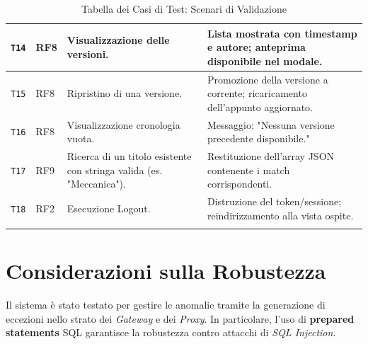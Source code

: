 \begin{longtable}[c]{|p{}|p{}|p{}|p{}|}
    \texttt{T14} & RF8  & Visualizzazione delle versioni. & Lista mostrata con timestamp e autore; anteprima disponibile nel modale. \\ \hline
    \texttt{T15} & RF8  & Ripristino di una versione. & Promozione della versione a corrente; ricaricamento dell'appunto aggiornato. \\ \hline
    \texttt{T16} & RF8  & Visualizzazione cronologia vuota. & Messaggio: "Nessuna versione precedente disponibile." \\ \hline
    \texttt{T17} & RF9  & Ricerca di un titolo esistente con stringa valida (es. "Meccanica"). & Restituzione dell'array JSON contenente i match corrispondenti. \\ \hline
    \texttt{T18} & RF2  & Esecuzione Logout. & Distruzione del token/sessione; reindirizzamento alla vista ospite. \\ \hline
    
    \caption{Tabella dei Casi di Test: Scenari di Validazione}
    \label{tab:test_plan}
\end{longtable}
\endgroup



\section{Considerazioni sulla Robustezza}
\noindent Il sistema è stato testato per gestire le anomalie tramite la generazione di eccezioni nello strato dei \textit{Gateway} e dei \textit{Proxy}. In particolare, l'uso di \textbf{prepared statements} SQL garantisce la robustezza contro attacchi di \textit{SQL Injection}.
